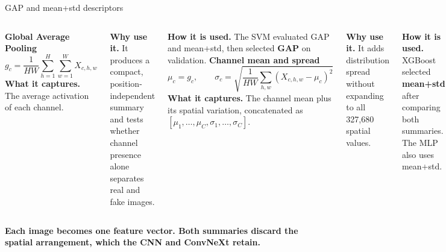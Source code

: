 \documentclass[11pt,aspectratio=169,t]{beamer}
\begin{document}
\begin{frame}{GAP and mean+std descriptors}
  \centering
  \vspace{0.08cm}
  \begin{columns}[T,onlytextwidth]
      {\color{Blue}\bfseries Global Average Pooling}
      \vspace{-0.08cm}
      {\small\[
        g_c=\frac{1}{HW}\sum_{h=1}^{H}\sum_{w=1}^{W}X_{c,h,w}
      \]}
      \scriptsize
      \textbf{What it captures.} The average activation of each channel.\par\smallskip
      \textbf{Why use it.} It produces a compact, position-independent summary and tests whether channel presence alone separates real and fake images.\par\smallskip
      \textbf{How it is used.} The SVM evaluated GAP and mean+std, then selected \textbf{GAP} on validation.
      {\color{Purple}\bfseries Channel mean and spread}
      \vspace{-0.08cm}
      {\scriptsize\[
        \mu_c=g_c,\qquad
        \sigma_c=\sqrt{\frac{1}{HW}\sum_{h,w}(X_{c,h,w}-\mu_c)^2}
      \]}
      \scriptsize
      \textbf{What it captures.} The channel mean plus its spatial variation, concatenated as \([\mu_1,\ldots,\mu_C,\sigma_1,\ldots,\sigma_C]\).\par\smallskip
      \textbf{Why use it.} It adds distribution spread without expanding to all 327,680 spatial values.\par\smallskip
      \textbf{How it is used.} XGBoost selected \textbf{mean+std} after comparing both summaries. The MLP also uses mean+std.
  \end{columns}
  \vfill
  {\scriptsize\color{Navy}\bfseries Each image becomes one feature vector. Both summaries discard the spatial arrangement, which the CNN and ConvNeXt retain.}
\end{frame}
\end{document}
